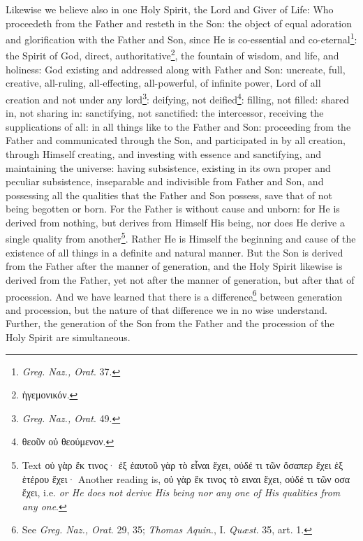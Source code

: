 Likewise we believe also in one Holy Spirit, the Lord and Giver of Life: Who proceedeth from the Father and resteth in the Son: the object of equal adoration and glorification with the Father and Son, since He is co-essential and co-eternal\footnote{\emph{Greg. Naz., Orat}. 37.}: the Spirit of God, direct, authoritative\footnote{\textgreek{ἡγεμονικόν}.}, the fountain of wisdom, and life, and holiness: God existing and addressed along with Father and Son: uncreate, full, creative, all-ruling, all-effecting, all-powerful, of infinite power, Lord of all creation and not under any lord\footnote{\emph{Greg. Naz., Orat}. 49.}: deifying, not deified\footnote{\textgreek{θεοῦν οὐ θεούμενον}.}: filling, not filled: shared in, not sharing in: sanctifying, not sanctified: the intercessor, receiving the supplications of all: in all things like to the Father and Son: proceeding from the Father and communicated through the Son, and participated in by all creation, through Himself creating, and investing with essence and sanctifying, and maintaining the universe: having subsistence, existing in its own proper and peculiar subsistence, inseparable and indivisible from Father and Son, and possessing all the qualities that the Father and Son possess, save that of not being begotten or born. For the Father is without cause and unborn: for He is derived from nothing, but derives from Himself His being, nor does He derive a single quality from another\footnote{Text \textgreek{οὐ γὰρ ἔκ τινος· ἐξ ἑαυτοῦ γὰρ τὸ εἶναι ἔχει, οὐδέ τι τῶν ὅσαπερ ἔχει ἐξ ἑτέρου ἔχει·} Another reading is, \textgreek{οὐ γὰρ ἔκ τινος τὸ ειναι ἔχει, οὐδέ τι τῶν οσα ἔχει}, i.e. \emph{or He does not derive His being nor any one of His qualities from any one}.}. Rather He is Himself the beginning and cause of the existence of all things in a definite and natural manner. But the Son is derived from the Father after the manner of generation, and the Holy Spirit likewise is derived from the Father, yet not after the manner of generation, but after that of procession. And we have learned that there is a difference\footnote{See \emph{Greg. Naz., Orat}. 29, 35; \emph{Thomas Aquin}., I. \emph{Quæst}. 35, art. 1.} between generation and procession, but the nature of that difference we in no wise understand. Further, the generation of the Son from the Father and the procession of the Holy Spirit are simultaneous.

